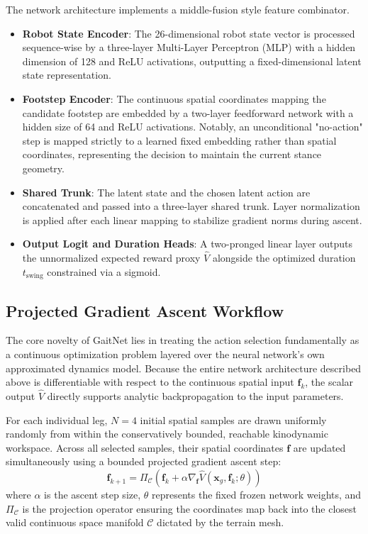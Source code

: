 The network architecture implements a middle-fusion style feature combinator.
\begin{itemize}
  \item \textbf{Robot State Encoder}: The 26-dimensional robot state
    vector is processed sequence-wise by a three-layer Multi-Layer
    Perceptron (MLP) with a hidden dimension of 128 and ReLU
    activations, outputting a fixed-dimensional latent state representation.
  \item \textbf{Footstep Encoder}: The continuous spatial coordinates
    mapping the candidate footstep are embedded by a two-layer
    feedforward network with a hidden size of 64 and ReLU
    activations. Notably, an unconditional "no-action" step is mapped
    strictly to a learned fixed embedding rather than spatial
    coordinates, representing the decision to maintain the current
    stance geometry.
  \item \textbf{Shared Trunk}: The latent state and the chosen latent
    action are concatenated and passed into a three-layer shared
    trunk. Layer normalization is applied after each linear mapping
    to stabilize gradient norms during ascent.
  \item \textbf{Output Logit and Duration Heads}: A two-pronged
    linear layer outputs the unnormalized expected reward proxy
    $\hat{V}$ alongside the optimized duration $t_{\text{swing}}$
    constrained via a sigmoid.
\end{itemize}

\subsection{Projected Gradient Ascent Workflow}
\label{subsec:methodology-gaitnet-gradient-ascent}

The core novelty of GaitNet lies in treating the action selection
fundamentally as a continuous optimization problem layered over the
neural network's own approximated dynamics model. Because the entire
network architecture described above is differentiable with respect
to the continuous spatial input $\mathbf{f}_k$, the scalar output
$\hat{V}$ directly supports analytic backpropagation to the input parameters.

For each individual leg, $N=4$ initial spatial samples are drawn
uniformly randomly from within the conservatively bounded, reachable
kinodynamic workspace. Across all selected samples, their spatial
coordinates $\mathbf{f}$ are updated simultaneously using a bounded
projected gradient ascent step:
\begin{equation}
  \mathbf{f}_{k+1} = \Pi_{\mathcal{C}} \left( \mathbf{f}_k + \alpha
  \nabla_{\mathbf{f}} \hat{V}(\mathbf{x}_g, \mathbf{f}_k; \theta) \right)
\end{equation}
where $\alpha$ is the ascent step size, $\theta$ represents the fixed
frozen network weights, and $\Pi_{\mathcal{C}}$ is the projection
operator ensuring the coordinates map back into the closest valid
continuous space manifold $\mathcal{C}$ dictated by the terrain mesh.

